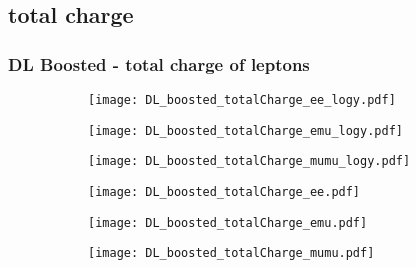 \documentclass[aspectratio=169,8pt]{beamer}
\begin{document}
\subsection{total charge}
\begin{frame}
\frametitle{DL Boosted - total charge of leptons}
\begin{figure}
\captionsetup[subfigure]{labelformat=empty}
\begin{subfigure}{0.32\textwidth}
\texttt{[image: DL\_boosted\_totalCharge\_ee\_logy.pdf]}
\vspace*{-0.15cm}
\end{subfigure}
\hfil
\begin{subfigure}{0.32\textwidth}
\texttt{[image: DL\_boosted\_totalCharge\_emu\_logy.pdf]}
\vspace*{-0.15cm}
\end{subfigure}
\hfil
\begin{subfigure}{0.32\textwidth}
\texttt{[image: DL\_boosted\_totalCharge\_mumu\_logy.pdf]}
\vspace*{-0.15cm}
\end{subfigure}
\hfil
\begin{subfigure}{0.32\textwidth}
\texttt{[image: DL\_boosted\_totalCharge\_ee.pdf]}
\vspace*{-0.15cm}
\end{subfigure}
\hfil
\begin{subfigure}{0.32\textwidth}
\texttt{[image: DL\_boosted\_totalCharge\_emu.pdf]}
\vspace*{-0.15cm}
\end{subfigure}
\hfil
\begin{subfigure}{0.32\textwidth}
\texttt{[image: DL\_boosted\_totalCharge\_mumu.pdf]}
\vspace*{-0.15cm}
\end{subfigure}
\hfil
\end{figure}
\end{frame}
\newpage
\end{document}
